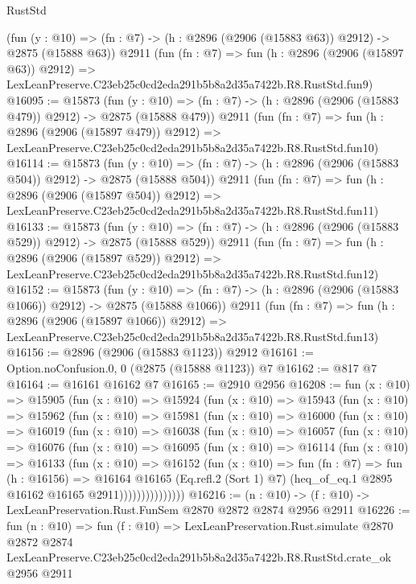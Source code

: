 \begin{lexlean}{RustStd}
\begin{coremodule}
    (fun (y : @10) => (fn : @7) -> (h : @2896 (@2906 (@15883 @63)) @2912) -> @2875 (@15888 @63))
    @2911
    (fun (fn : @7) =>
    fun (h : @2896 (@2906 (@15897 @63)) @2912) =>
    LexLeanPreserve.C23eb25c0cd2eda291b5b8a2d35a7422b.R8.RustStd.fun9)
@16095 := @15873
    (fun (y : @10) => (fn : @7) -> (h : @2896 (@2906 (@15883 @479)) @2912) -> @2875 (@15888 @479))
    @2911
    (fun (fn : @7) =>
    fun (h : @2896 (@2906 (@15897 @479)) @2912) =>
    LexLeanPreserve.C23eb25c0cd2eda291b5b8a2d35a7422b.R8.RustStd.fun10)
@16114 := @15873
    (fun (y : @10) => (fn : @7) -> (h : @2896 (@2906 (@15883 @504)) @2912) -> @2875 (@15888 @504))
    @2911
    (fun (fn : @7) =>
    fun (h : @2896 (@2906 (@15897 @504)) @2912) =>
    LexLeanPreserve.C23eb25c0cd2eda291b5b8a2d35a7422b.R8.RustStd.fun11)
@16133 := @15873
    (fun (y : @10) => (fn : @7) -> (h : @2896 (@2906 (@15883 @529)) @2912) -> @2875 (@15888 @529))
    @2911
    (fun (fn : @7) =>
    fun (h : @2896 (@2906 (@15897 @529)) @2912) =>
    LexLeanPreserve.C23eb25c0cd2eda291b5b8a2d35a7422b.R8.RustStd.fun12)
@16152 := @15873
    (fun (y : @10) => (fn : @7) -> (h : @2896 (@2906 (@15883 @1066)) @2912) -> @2875 (@15888 @1066))
    @2911
    (fun (fn : @7) =>
    fun (h : @2896 (@2906 (@15897 @1066)) @2912) =>
    LexLeanPreserve.C23eb25c0cd2eda291b5b8a2d35a7422b.R8.RustStd.fun13)
@16156 := @2896 (@2906 (@15883 @1123)) @2912
@16161 := Option.noConfusion.{0, 0} (@2875 (@15888 @1123)) @7
@16162 := @817 @7
@16164 := @16161 @16162 @7
@16165 := @2910 @2956
@16208 := fun (x : @10) =>
  @15905
    (fun (x : @10) =>
    @15924
      (fun (x : @10) =>
      @15943
        (fun (x : @10) =>
        @15962
          (fun (x : @10) =>
          @15981
            (fun (x : @10) =>
            @16000
              (fun (x : @10) =>
              @16019
                (fun (x : @10) =>
                @16038
                  (fun (x : @10) =>
                  @16057
                    (fun (x : @10) =>
                    @16076
                      (fun (x : @10) =>
                      @16095
                        (fun (x : @10) =>
                        @16114
                          (fun (x : @10) =>
                          @16133
                            (fun (x : @10) =>
                            @16152
                              (fun (x : @10) =>
                              fun (fn : @7) =>
                              fun (h : @16156) =>
                              @16164
                                @16165
                                (Eq.refl.{2} (Sort 1) @7)
                                (heq_of_eq.{1} @2895 @16162 @16165 @2911)))))))))))))))
@16216 := (n : @10) -> (f : @10) -> LexLeanPreservation.Rust.FunSem @2870 @2872 @2874 @2956 @2911
@16226 := fun (n : @10) =>
  fun (f : @10) =>
  LexLeanPreservation.Rust.simulate
    @2870
    @2872
    @2874
    LexLeanPreserve.C23eb25c0cd2eda291b5b8a2d35a7422b.R8.RustStd.crate_ok
    @2956
    @2911
\end{coremodule}
\end{lexlean}
